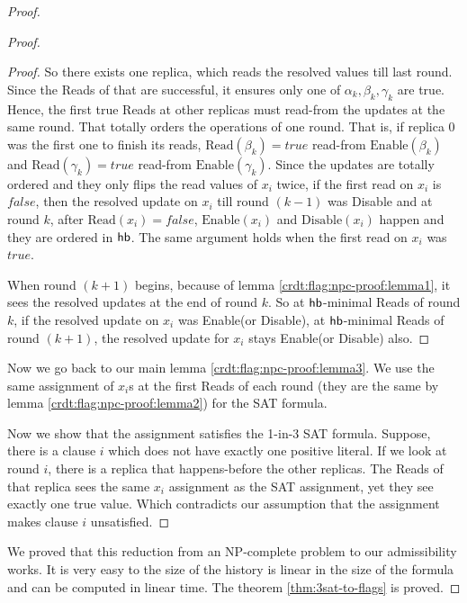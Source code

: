 \begin{proof}
\begin{proof}
\begin{proof}
    So there exists one replica, which reads the resolved values till last round. Since the \textrm{Read}s of that are successful, it ensures only one of $\alpha_k, \beta_k, \gamma_k$ are true. Hence, the first true \textrm{Read}s at other replicas must read-from the updates at the same round. That totally orders the operations of one round. That is, if replica 0 was the first one to finish its reads, $\mathrm{Read}(\beta_k) = true$ read-from $\mathrm{Enable}(\beta_k)$ and $\mathrm{Read}(\gamma_k) = true$ read-from $\mathrm{Enable}(\gamma_k)$. Since the updates are totally ordered and they only flips the read values of $x_i$ twice, \ie if the first read on $x_i$ is $false$, then the resolved update on $x_i$ till round $(k-1)$ was \textrm{Disable} and at round $k$, after $\mathrm{Read}(x_i) = false$, $\mathrm{Enable}(x_i)$ and $\mathrm{Disable}(x_i)$ happen and they are ordered in $\textsf{hb}$. The same argument holds when the first read on $x_i$ was $true$. 

    When round $(k+1)$ begins, because of lemma \ref{crdt:flag:npc-proof:lemma1}, it sees the resolved updates at the end of round $k$. So at $\textsf{hb}$-minimal \textrm{Read}s of round $k$, if the resolved update on $x_i$ was \textrm{Enable}(or \textrm{Disable}), at $\textsf{hb}$-minimal \textrm{Read}s of round $(k+1)$, the resolved update for $x_i$ stays \textrm{Enable}(or \textrm{Disable}) also.
  \end{proof}

  Now we go back to our main lemma \ref{crdt:flag:npc-proof:lemma3}. We use the same assignment of $x_i$s at the first \textrm{Read}s of each round (they are the same by lemma \ref{crdt:flag:npc-proof:lemma2}) for the SAT formula.

  Now we show that the assignment satisfies the 1-in-3 SAT formula. Suppose, there is a clause $i$ which does not have exactly one positive literal. If we look at round $i$, there is a replica that happens-before the other replicas. The \textrm{Read}s of that replica sees the same $x_i$ assignment as the SAT assignment, yet they see exactly one true value. Which contradicts our assumption that the assignment makes clause $i$ unsatisfied.
\end{proof}

We proved that this reduction from an NP-complete problem to our admissibility works. It is very easy to the size of the history is linear in the size of the formula and can be computed in linear time. The theorem \ref{thm:3sat-to-flags} is proved.


\end{proof}
